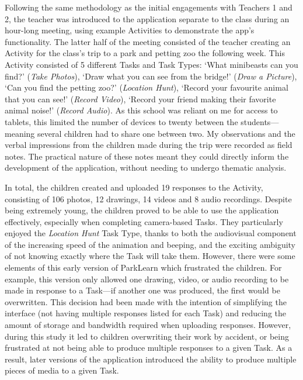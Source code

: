 Following the same methodology as the initial engagements with Teachers 1 and 2, the teacher was introduced to the application separate to the class during an hour-long meeting, using example Activities to demonstrate the app's functionality. The latter half of the meeting consisted of the teacher creating an Activity for the class's trip to a park and petting zoo the following week. This Activity consisted of 5 different Tasks and Task Types: `What minibeasts can you find?' (\textit{Take Photos}), `Draw what you can see from the bridge!' (\textit{Draw a Picture}), `Can you find the petting zoo?' (\textit{Location Hunt}), `Record your favourite animal that you can see!' (\textit{Record Video}), `Record your friend making their favorite animal noise!' (\textit{Record Audio}). As this school was reliant on me for access to tablets, this limited the number of devices to twenty between the students---meaning several children had to share one between two. My observations and the verbal impressions from the children made during the trip were recorded as field notes. The practical nature of these notes meant they could directly inform the development of the application, without needing to undergo thematic analysis.

In total, the children created and uploaded 19 responses to the Activity, consisting of 106 photos, 12 drawings, 14 videos and 8 audio recordings. Despite being extremely young, the children proved to be able to use the application effectively, especially when completing camera-based Tasks. They particularly enjoyed the \textit{Location Hunt} Task Type, thanks to both the audiovisual component of the increasing speed of the animation and beeping, and the exciting ambiguity of not knowing exactly where the Task will take them. However, there were some elements of this early version of ParkLearn which frustrated the children. For example, this version only allowed one drawing, video, or audio recording to be made in response to a Task---if another one was produced, the first would be overwritten. This decision had been made with the intention of simplifying the interface (not having multiple responses listed for each Task) and reducing the amount of storage and bandwidth required when uploading responses. However, during this study it led to children overwriting their work by accident, or being frustrated at not being able to produce multiple responses to a given Task. As a result, later versions of the application introduced the ability to produce multiple pieces of media to a given Task.

